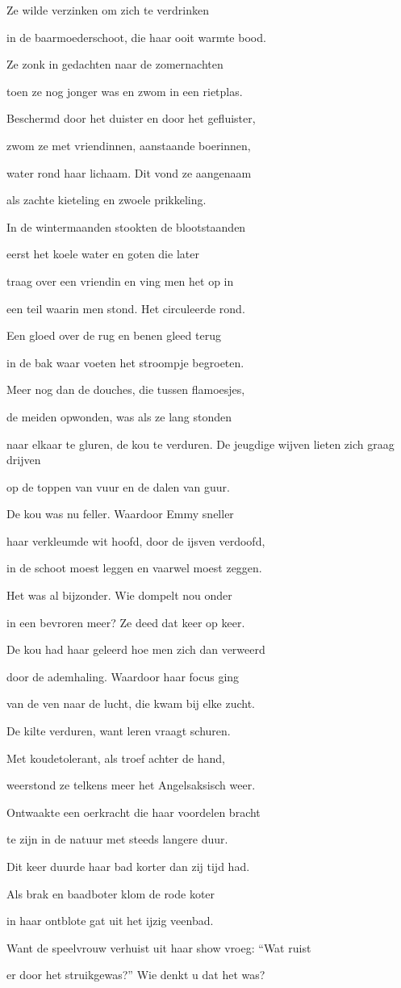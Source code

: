 Ze wilde verzinken
om zich te verdrinken

in de baarmoederschoot,
die haar ooit warmte bood.

Ze zonk in gedachten
naar de zomernachten

toen ze nog jonger was
en zwom in een rietplas.

Beschermd door het duister
en door het gefluister,

zwom ze met vriendinnen,
aanstaande boerinnen,

water rond haar lichaam.
Dit vond ze aangenaam

als zachte kieteling
en zwoele prikkeling.

In de wintermaanden
stookten de blootstaanden

eerst het koele water
en goten die later

traag over een vriendin
en ving men het op in

een teil waarin men stond.
Het circuleerde rond.

Een gloed over de rug
en benen gleed terug

in de bak waar voeten
het stroompje begroeten.

Meer nog dan de douches,
die tussen flamoesjes,

de meiden opwonden,
was als ze lang stonden

naar elkaar te gluren,
de kou te verduren.
De jeugdige wijven
lieten zich graag drijven

op de toppen van vuur
en de dalen van guur.

De kou was nu feller.
Waardoor Emmy sneller

haar verkleumde wit hoofd,
door de ijsven verdoofd,

in de schoot moest leggen
en vaarwel moest zeggen.

Het was al bijzonder.
Wie dompelt nou onder

in een bevroren meer?
Ze deed dat keer op keer.

De kou had haar geleerd
hoe men zich dan verweerd

door de ademhaling.
Waardoor haar focus ging

van de ven naar de lucht,
die kwam bij elke zucht.

De kilte verduren,
want leren vraagt schuren.

Met koudetolerant,
als troef achter de hand,

weerstond ze telkens meer
het Angelsaksisch weer.

Ontwaakte een oerkracht
die haar voordelen bracht

te zijn in de natuur
met steeds langere duur.

Dit keer duurde haar bad
korter dan zij tijd had.

Als brak en baadboter
klom de rode koter

in haar ontblote gat
uit het ijzig veenbad.

Want de speelvrouw verhuist
uit haar show vroeg: “Wat ruist

er door het struikgewas?”
Wie denkt u dat het was?
